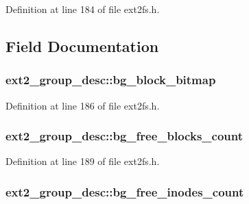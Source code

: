 \-Definition at line 184 of file ext2fs.\-h.



\subsection{\-Field \-Documentation}
\hypertarget{structext2__group__desc_a57481ebe34986e28812cc9b4e122c016}{
\subsubsection[{bg\-\_\-block\-\_\-bitmap}]{ {\bf ext2\-\_\-group\-\_\-desc\-::bg\-\_\-block\-\_\-bitmap}}}\label{structext2__group__desc_a57481ebe34986e28812cc9b4e122c016}


\-Definition at line 186 of file ext2fs.\-h.

\hypertarget{structext2__group__desc_af1cf7574780c76da67e973179f6edd43}{
\subsubsection[{bg\-\_\-free\-\_\-blocks\-\_\-count}]{ {\bf ext2\-\_\-group\-\_\-desc\-::bg\-\_\-free\-\_\-blocks\-\_\-count}}}\label{structext2__group__desc_af1cf7574780c76da67e973179f6edd43}


\-Definition at line 189 of file ext2fs.\-h.

\hypertarget{structext2__group__desc_a5488cd2eb4ea863ca9d15a5df8da6bab}{
\subsubsection[{bg\-\_\-free\-\_\-inodes\-\_\-count}]{ {\bf ext2\-\_\-group\-\_\-desc\-::bg\-\_\-free\-\_\-inodes\-\_\-count}}}\label{structext2__group__desc_a5488cd2eb4ea863ca9d15a5df8da6bab}


